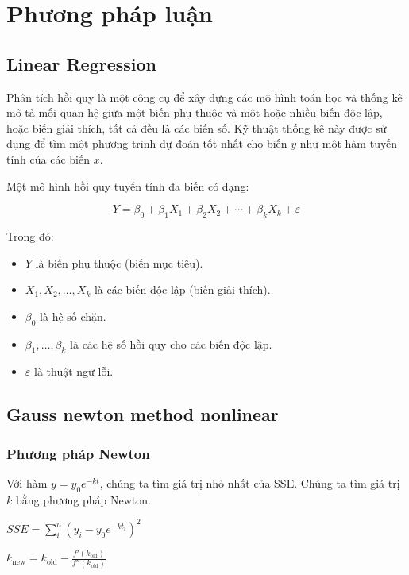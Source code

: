 \documentclass[conference]{IEEEtran}
\begin{document}
\section{Phương pháp luận}

\subsection{Linear Regression}
Phân tích hồi quy là một công cụ để xây dựng các mô hình toán học và thống kê mô tả mối quan hệ giữa một biến phụ thuộc và một hoặc nhiều biến độc lập, hoặc biến giải thích, tất cả đều là các biến số. Kỹ thuật thống kê này được sử dụng để tìm một phương trình dự đoán tốt nhất cho biến \( y \) như một hàm tuyến tính của các biến \( x \).

Một mô hình hồi quy tuyến tính đa biến có dạng:

\[ Y = \beta_0 + \beta_1X_1 + \beta_2X_2 + \cdots + \beta_kX_k + \varepsilon \]

Trong đó:
\begin{itemize}
    \item \( Y \) là biến phụ thuộc (biến mục tiêu).
    \item \( X_1, X_2, \ldots, X_k \) là các biến độc lập (biến giải thích).
    \item \( \beta_0 \) là hệ số chặn.
    \item \( \beta_1, \ldots, \beta_k \) là các hệ số hồi quy cho các biến độc lập.
    \item \( \varepsilon \) là thuật ngữ lỗi.
\end{itemize}


\subsection{Gauss newton method nonlinear}

\subsubsection{Phương pháp Newton}
Với hàm \( y = y_0 e^{-kt} \), chúng ta tìm giá trị nhỏ nhất của SSE. Chúng ta tìm giá trị \(k\) bằng phương pháp Newton.

\begin{center}
    $SSE = \sum_{i}^{n}(y_i - y_0 e^{-kt_i})^2$
\end{center}

\begin{center}
    \(k_{\text{new}} = k_{\text{old}} - \frac{f'(k_{\text{old}})}{f''(k_{\text{old}})}\)
\end{center}
\end{document}
